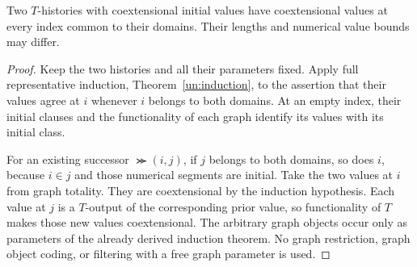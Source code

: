 \begin{lemma}
\label{un:history-unique}
Two $T$-histories with coextensional initial values have coextensional
values at every index common to their domains. Their lengths and
numerical value bounds may differ.
\end{lemma}
\begin{proof}
Keep the two histories and all their parameters fixed. Apply full
representative induction, Theorem~\ref{un:induction}, to the assertion
that their values agree at $i$ whenever $i$ belongs to both domains.
At an empty index, their initial clauses and the functionality of each
graph identify its values with its initial class.

For an existing successor $\Succ(i,j)$, if $j$ belongs to both domains,
so does $i$, because $i\in j$ and those numerical segments are initial.
Take the two values at $i$ from graph totality. They are coextensional
by the induction hypothesis. Each value at $j$ is a $T$-output of the
corresponding prior value, so functionality of $T$ makes those new
values coextensional. The arbitrary graph objects occur only as
parameters of the already derived induction theorem. No graph
restriction, graph object coding, or filtering with a free graph
parameter is used.
\end{proof}

